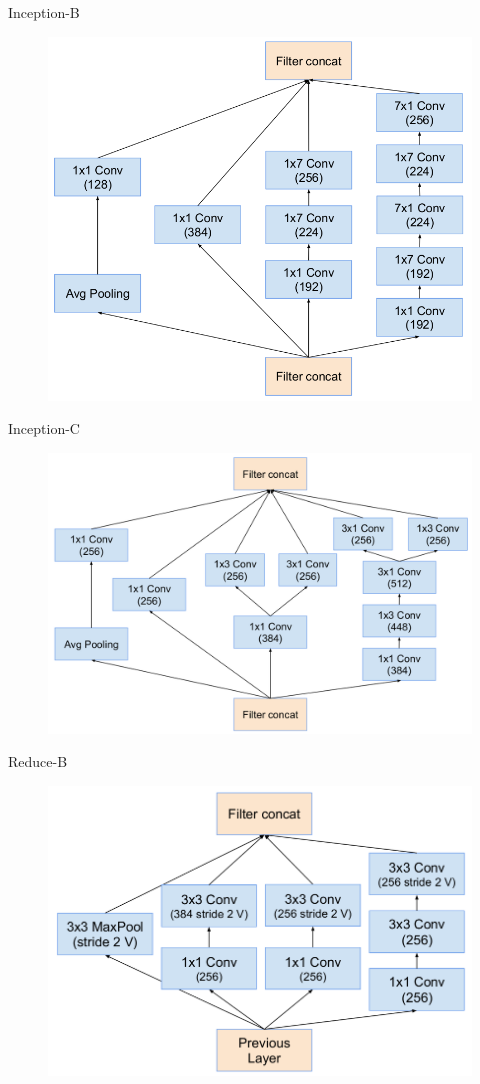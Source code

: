 \documentclass[compress]{beamer}
\begin{document}
\begin{frame}{Inception-B}
\begin{figure}[H]
\includegraphics[scale=0.3]{inceptionB.png}
\end{figure}
\end{frame}

\begin{frame}{Inception-C}
\begin{figure}[H]
\includegraphics[scale=0.29]{inceptionC.png}
\end{figure}
\end{frame}

\begin{frame}{Reduce-B}
\begin{figure}[H]
\includegraphics[scale=0.3]{reduceB.png}
\end{figure}
\end{frame}
\end{document}
